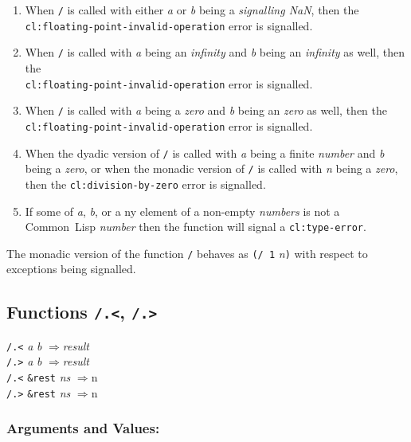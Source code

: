 \documentclass[10pt,fleqn]{article}
\newcommand{\CL}{\textsf{Common~Lisp}}
\newcommand{\code}[1]{\texttt{#1}}
\newcommand{\clieeeterm}[1]{\textit{#1}}
\newcommand{\varname}[1]{\textit{#1}}
\newcommand{\clterm}[1]{\textit{#1}}
\newcommand{\clname}[1]{\texttt{#1}}
\newcommand{\RArrow}{$\Rightarrow$}
\newcommand{\DDictionaryItem}[1]{\vspace*{6pt}\noindent\hrulefill\vspace*{-9pt}\subsection*{#1}}
\newcommand{\DArgsNValues}{\subsubsection*{Arguments and Values:}}
\begin{document}
\begin{enumerate}
\item When \code{/} is called with either \varname{a} or \varname{b}
  being a \emph{signalling NaN}, then the\\
  \clname{cl:floating-point-invalid-operation} error is signalled.

\item When \code{/} is called with \varname{a} being an 
  \clieeeterm{infinity} and \varname{b} being an 
  \clieeeterm{infinity} as well, then the\\
  \clname{cl:floating-point-invalid-operation} error is signalled.

\item When \code{/} is called with \varname{a} being a
  \clieeeterm{zero} and \varname{b} being an 
  \clieeeterm{zero} as well, then the\\
  \clname{cl:floating-point-invalid-operation} error is signalled.

\item When the dyadic version of \code{/} is called with \varname{a}
  being a finite \clterm{number} and \varname{b} being a
  \clieeeterm{zero}, or when the monadic version of \code{/} is called
  with \varname{n} being a \clieeeterm{zero}, then the
  \clname{cl:division-by-zero} error is signalled.

\item If some of \varname{a}, \varname{b}, or a
  ny element of a non-empty
  \varname{numbers} is not a \CL{} \clterm{number} then the function
  will signal a \clname{cl:type-error}.
\end{enumerate}

\noindent
The monadic version of the function \code {/} behaves as \code{(/ 1}
\varname{n}\code{)} with respect to exceptions being signalled.


\DDictionaryItem{Functions \code{/.<}, \code{/.>}}
\index{*!\code{/.<}}
\index{*!\code{/.>}}


\code{/.<} \varname{a} \varname{b} \RArrow \varname{result}\\
\code{/.>} \varname{a} \varname{b} \RArrow \varname{result}\\
\code{/.<} \code{\&rest} \varname{ns} \RArrow \varname \code{n}\\
\code{/.>} \code{\&rest} \varname{ns} \RArrow \varname \code{n}\\

\DArgsNValues{}
\end{document}
